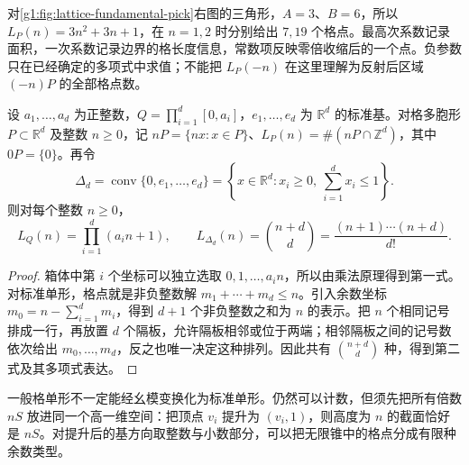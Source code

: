 对\cref{g1:fig:lattice-fundamental-pick}右图的三角形，\(A=3\)、\(B=6\)，所以 \(L_P(n)=3n^2+3n+1\)，在 \(n=1,2\) 时分别给出 \(7,19\) 个格点。最高次系数记录面积，一次系数记录边界的格长度信息，常数项反映零倍收缩后的一个点。负参数只在已经确定的多项式中求值；不能把 \(L_P(-n)\) 在这里理解为反射后区域 \((-n)P\) 的全部格点数。

\begin{proposition}
	\label{g1:prop:box-simplex-ehrhart}
	设 \(a_1,\ldots,a_d\) 为正整数，\(Q=\prod_{i=1}^d[0,a_i]\)，\(e_1,\ldots,e_d\) 为 \(\mathbb R^d\) 的标准基。对格多胞形 \(P\subset\mathbb R^d\) 及整数 \(n\ge0\)，记 \(nP=\{nx:x\in P\}\)、\(L_P(n)=\#(nP\cap\mathbb Z^d)\)，其中 \(0P=\{0\}\)。再令
	\[
		\Delta_d=\operatorname{conv}\{0,e_1,\ldots,e_d\}
		=\left\{x\in\mathbb R^d:x_i\ge0,\ \sum_{i=1}^d x_i\le1\right\}.
	\]
	则对每个整数 \(n\ge0\)，
	\[
		L_Q(n)=\prod_{i=1}^d(a_i n+1),\qquad
		L_{\Delta_d}(n)=\binom{n+d}{d}
		=\frac{(n+1)\cdots(n+d)}{d!}.
	\]
\end{proposition}
\begin{proof}
	箱体中第 \(i\) 个坐标可以独立选取 \(0,1,\ldots,a_i n\)，所以由乘法原理得到第一式。对标准单形，格点就是非负整数解 \(m_1+\cdots+m_d\le n\)。引入余数坐标 \(m_0=n-\sum_{i=1}^d m_i\)，得到 \(d+1\) 个非负整数之和为 \(n\) 的表示。把 \(n\) 个相同记号排成一行，再放置 \(d\) 个隔板，允许隔板相邻或位于两端；相邻隔板之间的记号数依次给出 \(m_0,\ldots,m_d\)，反之也唯一决定这种排列。因此共有 \(\binom{n+d}{d}\) 种，得到第二式及其多项式表达。
\end{proof}

一般格单形不一定能经幺模变换化为标准单形。仍然可以计数，但须先把所有倍数 \(nS\) 放进同一个高一维空间：把顶点 \(v_i\) 提升为 \((v_i,1)\)，则高度为 \(n\) 的截面恰好是 \(nS\)。对提升后的基方向取整数与小数部分，可以把无限锥中的格点分成有限种余数类型。

